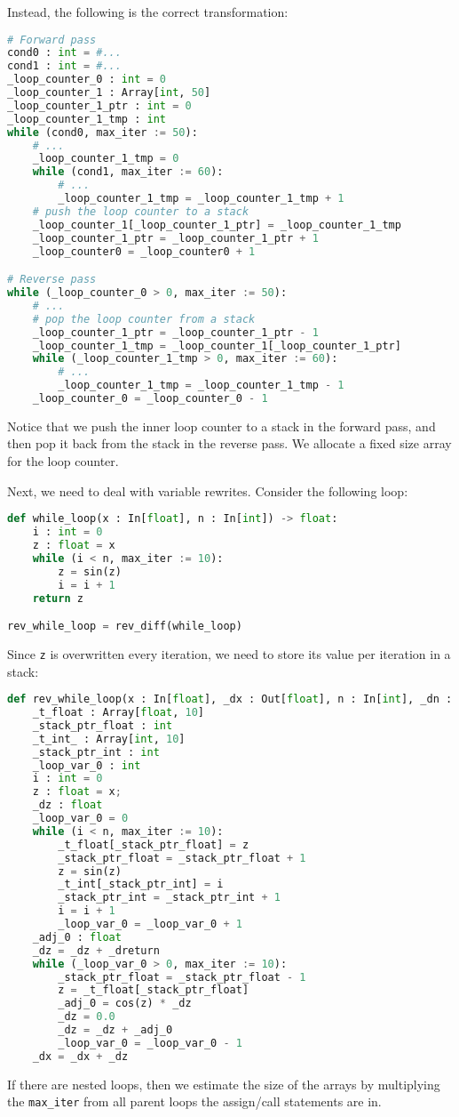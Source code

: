 Instead, the following is the correct transformation:
\begin{lstlisting}[language=Python]
# Forward pass
cond0 : int = #...
cond1 : int = #...
_loop_counter_0 : int = 0
_loop_counter_1 : Array[int, 50]
_loop_counter_1_ptr : int = 0
_loop_counter_1_tmp : int
while (cond0, max_iter := 50):
    # ...
    _loop_counter_1_tmp = 0
    while (cond1, max_iter := 60):
        # ...
        _loop_counter_1_tmp = _loop_counter_1_tmp + 1
    # push the loop counter to a stack
    _loop_counter_1[_loop_counter_1_ptr] = _loop_counter_1_tmp
    _loop_counter_1_ptr = _loop_counter_1_ptr + 1
    _loop_counter0 = _loop_counter0 + 1

# Reverse pass
while (_loop_counter_0 > 0, max_iter := 50):
    # ...
    # pop the loop counter from a stack
    _loop_counter_1_ptr = _loop_counter_1_ptr - 1
    _loop_counter_1_tmp = _loop_counter_1[_loop_counter_1_ptr]
    while (_loop_counter_1_tmp > 0, max_iter := 60):
        # ...
        _loop_counter_1_tmp = _loop_counter_1_tmp - 1
    _loop_counter_0 = _loop_counter_0 - 1
\end{lstlisting}
Notice that we push the inner loop counter to a stack in the forward pass, and then pop it back from the stack in the reverse pass. We allocate a fixed size array for the loop counter. 

Next, we need to deal with variable rewrites. Consider the following loop:
\begin{lstlisting}[language=Python]
def while_loop(x : In[float], n : In[int]) -> float:
    i : int = 0
    z : float = x
    while (i < n, max_iter := 10):
        z = sin(z)
        i = i + 1
    return z

rev_while_loop = rev_diff(while_loop)
\end{lstlisting}
Since \lstinline{z} is overwritten every iteration, we need to store its value per iteration in a stack:
\begin{lstlisting}[language=Python]
def rev_while_loop(x : In[float], _dx : Out[float], n : In[int], _dn : Out[int], _dreturn : In[float]):
    _t_float : Array[float, 10]
    _stack_ptr_float : int
    _t_int_ : Array[int, 10]
    _stack_ptr_int : int
    _loop_var_0 : int
    i : int = 0
    z : float = x;
    _dz : float
    _loop_var_0 = 0
    while (i < n, max_iter := 10):
        _t_float[_stack_ptr_float] = z
        _stack_ptr_float = _stack_ptr_float + 1
        z = sin(z)
        _t_int[_stack_ptr_int] = i
        _stack_ptr_int = _stack_ptr_int + 1
        i = i + 1
        _loop_var_0 = _loop_var_0 + 1
    _adj_0 : float
    _dz = _dz + _dreturn
    while (_loop_var_0 > 0, max_iter := 10):
        _stack_ptr_float = _stack_ptr_float - 1
        z = _t_float[_stack_ptr_float]
        _adj_0 = cos(z) * _dz
        _dz = 0.0
        _dz = _dz + _adj_0
        _loop_var_0 = _loop_var_0 - 1
    _dx = _dx + _dz
\end{lstlisting}
If there are nested loops, then we estimate the size of the arrays by multiplying the \lstinline{max_iter} from all parent loops the assign/call statements are in.

